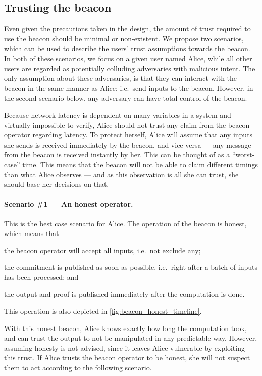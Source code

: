 \subsection{Trusting the beacon}%
\label{sub:trusting_the_beacon}

Even given the precautions taken in the design, the amount of trust required to use the beacon should be minimal or non-existent.
We propose two scenarios, which can be used to describe the users' trust assumptions towards the beacon.
In both of these scenarios, we focus on a given user named Alice, while all other users are regarded as potentially colluding adversaries with malicious intent.
The only assumption about these adversaries, is that they can interact with the beacon in the same manner as Alice; i.e.\ send inputs to the beacon.
However, in the second scenario below, any adversary can have total control of the beacon.

Because network latency is dependent on many variables in a system and virtually impossible to verify, Alice should not trust any claim from the beacon operator regarding latency.
To protect herself, Alice will assume that any inputs she sends is received immediately by the beacon, and vice versa --- any message from the beacon is received instantly by her. This can be thought of as a \enquote{worst-case} time.
This means that the beacon will not be able to claim different timings than what Alice observes --- and as this observation is all she can trust, she should base her decisions on that.

\paragraph{Scenario \#1 --- An honest operator.}
This is the best case scenario for Alice.
The operation of the beacon is honest, which means that
\begin{eletterate*}
\item the beacon operator will accept all inputs, i.e.\ not exclude any;
\item the commitment is published as soon as possible, i.e.\ right after a batch of inputs has been processed; and
\item the output and proof is published immediately after the computation is done.
\end{eletterate*}
This operation is also depicted in \cref{fig:beacon_honest_timeline}.

With this honest beacon, Alice knows exactly how long the computation took, and can trust the output to not be manipulated in any predictable way.
However, assuming honesty is not advised, since it leaves Alice vulnerable by exploiting this trust.
If Alice trusts the beacon operator to be honest, she will not suspect them to act according to the following scenario.

